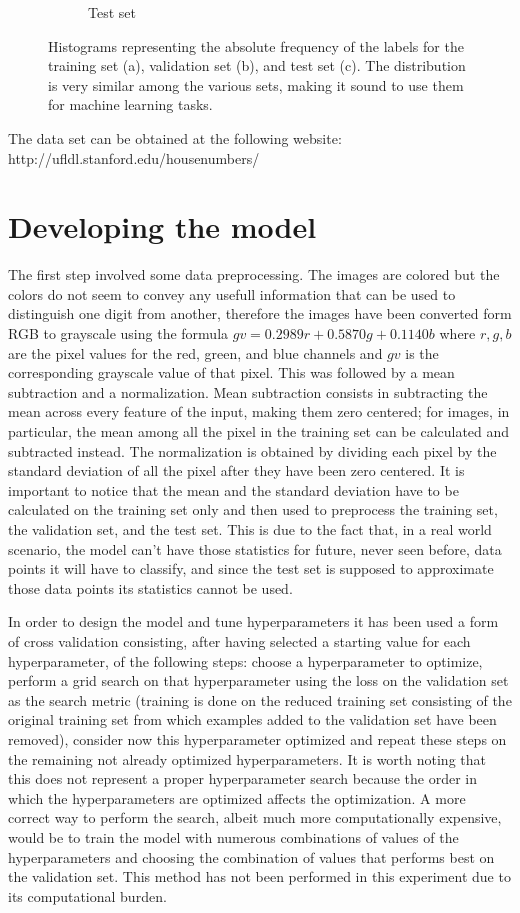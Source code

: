 \documentclass[12pt]{article}
\begin{document}
\begin{figure}[h]
\begin{subfigure}{0.31\textwidth}
		\caption{Test set}
		\label{fig:histc}
	\end{subfigure}
	\caption{Histograms representing the absolute frequency of the labels for the training set (a), validation set (b), and test set (c). The distribution is very similar among the various sets, making it sound to use them for machine learning tasks.}
	\label{fig:hist}
\end{figure}
The data set can be obtained at the following website: http://ufldl.stanford.edu/housenumbers/

\section*{Developing the model}

The first step involved some data preprocessing. The images are colored but the colors do not seem to convey any usefull information that can be used to distinguish one digit from another, therefore the images have been converted form RGB to grayscale using the formula $ gv = 0.2989r+0.5870g+0.1140b $ where $r, g, b$ are the pixel values for the red, green, and blue channels and $gv$ is the corresponding grayscale value of that pixel. This was followed by a mean subtraction and a normalization. Mean subtraction consists in subtracting the mean across every feature of the input, making them zero centered; for images, in particular, the mean among all the pixel in the training set can be calculated and subtracted instead. The normalization is obtained by dividing each pixel by the standard deviation of all the pixel after they have been zero centered. It is important to notice that the mean and the standard deviation have to be calculated on the training set only and then used to preprocess the training set, the validation set, and the test set. This is due to the fact that, in a real world scenario, the model can't have those statistics for future, never seen before, data points it will have to classify, and since the test set is supposed to approximate  those data points its statistics cannot be used.

In order to design the model and tune hyperparameters it has been used a form of cross validation consisting, after having selected a starting value for each hyperparameter, of the following steps: choose a hyperparameter to optimize, perform a grid search on that hyperparameter using the loss on the validation set as the search metric (training is done on the reduced training set consisting of the original training set from which examples added to the validation set have been removed), consider now this hyperparameter optimized and repeat these steps on the remaining not already optimized hyperparameters. It is worth noting that this does not represent a proper hyperparameter search because the order in which the hyperparameters are optimized affects the optimization. A more correct way to perform the search, albeit much more computationally expensive, would be to train the model with numerous combinations of values of the hyperparameters and choosing the combination of values that performs best on the validation set. This method has not been performed in this experiment due to its computational burden.
\end{document}
